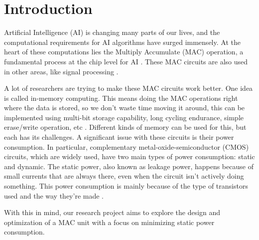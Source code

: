 \section{Introduction}

Artificial Intelligence (AI) is changing many parts of our lives, and the computational requirements for AI algorithms have surged immensely.  At the heart of these computations lies the Multiply Accumulate (MAC) operation, a fundamental process at the chip level for AI \cite{wang_2021_an}. These MAC circuits are also used in other areas, like signal processing \cite{ntnudepartmentofelectronicsystems_2023_project}.

A lot of researchers are trying to make these MAC circuits work better. One idea is called in-memory computing. This means doing the MAC operations right where the data is stored, so we don't waste time moving it around, this can be implemented using multi-bit storage capability, long cycling endurance, simple erase/write operation, etc \cite{wang_2021_an}. Different kinds of memory can be used for this, but each has its challenges. A significant issue with these circuits is their power consumption. In particular, complementary metal-oxide-semiconductor (CMOS) circuits, which are widely used, have two main types of power consumption: static and dynamic. The static power, also known as leakage power, happens because of small currents that are always there, even when the circuit isn't actively doing something. This power consumption is mainly because of the type of transistors used and the way they're made \cite{beloglazov_2011_advances}.

With this in mind, our research project aims to explore the design and optimization of a MAC unit with a focus on minimizing static power consumption.